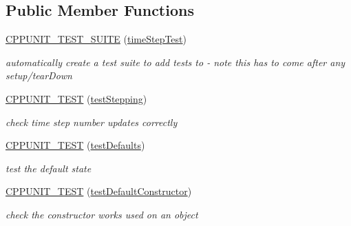 \subsection*{Public Member Functions}
\begin{DoxyCompactItemize}
\item 
\mbox{\label{classtimeStepTest_a33172d5eb5f67ad6eb8ef3e04baed49c}} 
\mbox{\hyperlink{classtimeStepTest_a33172d5eb5f67ad6eb8ef3e04baed49c}{C\+P\+P\+U\+N\+I\+T\+\_\+\+T\+E\+S\+T\+\_\+\+S\+U\+I\+TE}} (\mbox{\hyperlink{classtimeStepTest}{time\+Step\+Test}})
\begin{DoxyCompactList}\small\item\em automatically create a test suite to add tests to -\/ note this has to come after any setup/tear\+Down \end{DoxyCompactList}\item 
\mbox{\label{classtimeStepTest_af38279a078dff48ea04654c02d8b5486}} 
\mbox{\hyperlink{classtimeStepTest_af38279a078dff48ea04654c02d8b5486}{C\+P\+P\+U\+N\+I\+T\+\_\+\+T\+E\+ST}} (\mbox{\hyperlink{classtimeStepTest_a8853eb9214716d678e9c341470582fec}{test\+Stepping}})
\begin{DoxyCompactList}\small\item\em check time step number updates correctly \end{DoxyCompactList}\item 
\mbox{\label{classtimeStepTest_a8dd61267ca389d04a8db4776b64eee9a}} 
\mbox{\hyperlink{classtimeStepTest_a8dd61267ca389d04a8db4776b64eee9a}{C\+P\+P\+U\+N\+I\+T\+\_\+\+T\+E\+ST}} (\mbox{\hyperlink{classtimeStepTest_ae501f2f63633a2b24c4cfc1f9c33f96b}{test\+Defaults}})
\begin{DoxyCompactList}\small\item\em test the default state \end{DoxyCompactList}\item 
\mbox{\label{classtimeStepTest_a215e48294ca13fb21cd703e31e80bf48}} 
\mbox{\hyperlink{classtimeStepTest_a215e48294ca13fb21cd703e31e80bf48}{C\+P\+P\+U\+N\+I\+T\+\_\+\+T\+E\+ST}} (\mbox{\hyperlink{classtimeStepTest_a3e6e3abcb3b887cd3ebbbacb3c6a812f}{test\+Default\+Constructor}})
\begin{DoxyCompactList}\small\item\em check the constructor works used on an object \end{DoxyCompactList}\item 

\end{DoxyCompactItemize}
